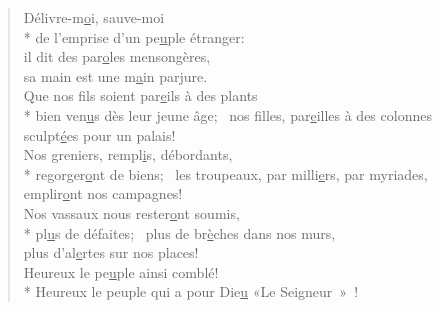 \begin{verse}
Délivre-m\underline{o}i, sauve-moi \\*
de l’emprise d’un pe\underline{u}ple étranger: \\
il dit des par\underline{o}les mensongères, \\
sa main est une m\underline{a}in parjure. \\

Que nos fils soient par\underline{e}ils à des plants \\*
bien ven\underline{u}s dès leur jeune âge;~\psalmstar
nos filles, par\underline{e}illes à des colonnes \\
sculpt\underline{é}es pour un palais! \\

Nos greniers, rempl\underline{i}s, débordants, \\*
regorger\underline{o}nt de biens;~\psalmstar
les troupeaux, par milli\underline{e}rs, par myriades, \\
emplir\underline{o}nt nos campagnes! \\

Nos vassaux nous rester\underline{o}nt soumis, \\*
pl\underline{u}s de défaites;~\psalmstar
plus de br\underline{è}ches dans nos murs, \\
plus d’al\underline{e}rtes sur nos places! \\

Heureux le pe\underline{u}ple ainsi comblé! \\*
Heureux le peuple qui a pour Die\underline{u} «Le Seigneur » ! \\
\end{verse}

